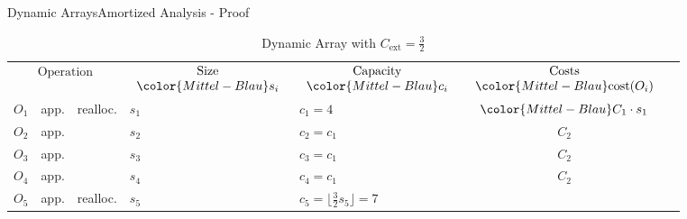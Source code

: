 \begin{frame}{Dynamic Arrays}{Amortized Analysis - Proof}
  \vspace*{-1.0em}%
  \begin{table}[!h]%
    \caption{Dynamic Array with %
      $C_\text{ext} = \frac{3}{2}$}%
    \label{tab:amortized_analysis_limit}%
    \vspace*{-0.2em}%
    \begin{tabular}{|l|l|l|l|l|c|@{}l}
\cline{1-6}%
      \multicolumn{3}{|c|}{$\begin{array}{c}
          \text{Operation}\\
        \end{array}$} &
      $\begin{array}{c}
        \text{Size}\\
        {\color{Mittel-Blau}s_i}
      \end{array}$ &
      $\begin{array}{c}
        \text{Capacity}\\
        {\color{Mittel-Blau}c_i}
      \end{array}$ &
      $\begin{array}{c}
        \text{Costs}\\
        {\color{Mittel-Blau}\mathrm{cost}(O_i)}
      \end{array}$\\
\cline{1-6}
      $O_1$ &app. & {\color{Mittel-Blau}realloc.} &
      $s_1$ & {\color{Mittel-Blau}$c_1=4$} &
      ${\color{Mittel-Blau}C_1 \cdot s_1}$ &
      \raisebox{-0.5em}{\multirow{4}{*}{%
        $\left.\begin{array}{@{}l@{}}\\[4.0em]\end{array}\right\rbrace
        \begin{array}{@{}l@{}}
           \text{distance}\\
           4 \geq \left\lfloor\dfrac{{\color{Mittel-Blau}s_1}}{2}\right\rfloor
        \end{array}$%
      }}\\
      $O_2$ &app.& {} & $s_2$ & $c_2 = c_1$ & $C_2$\\
      $O_3$ &app.& {} & $s_3$ & $c_3 = c_1$ & $C_2$\\
      $O_4$ &app.& {} & $s_4$ & $c_4 = c_1$ & $C_2$\\
\cline{1-6}%
      $O_5$ &app.& {\color{Mittel-Blau}realloc.} &
      $s_5$ & {\color{Mittel-Blau}$c_5 = \lfloor\frac{3}{2} s_5\rfloor=7$} &

\end{tabular}
\end{table}
\end{frame}
